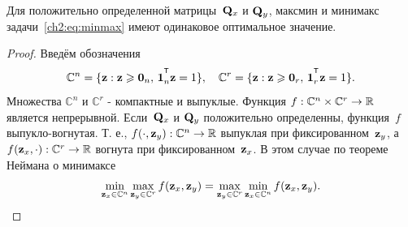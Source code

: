 \begin{theorem}
	Для положительно определенной матрицы~$\mathbf{Q}_x$ и $\mathbf{Q}_y$, максмин и минимакс задачи~\eqref{ch2:eq:minmax} имеют одинаковое оптимальное значение.
\end{theorem}
\begin{proof}
	Введём обозначения
	\begin{equation*}
	\mathbb{C}^n = \{\bz : \bz \geq \bZero_n, \, \bOne_n^{\T}\bz=1\}, \quad \mathbb{C}^r = \{\bz : \bz \geq \bZero_r, \, \bOne_r^{\T}\bz=1\}.
	\end{equation*}
	Множества $\mathbb{C}^n$ и $\mathbb{C}^r$ - компактные и выпуклые. Функция $f: \mathbb{C}^n \times \mathbb{C}^r \rightarrow \mathbb{R}$ является непрерывной. Если~$\mathbf{Q}_x$ и $\mathbf{Q}_y$ положительно определенны, функция~$f$ выпукло-вогнутая. Т. е.,
	$f(\cdot, \mathbf{z}_y): \mathbb{C}^n \rightarrow \mathbb{R}$ выпуклая при фиксированном~$\mathbf{z}_y$, а $f(\mathbf{z}_x, \cdot): \mathbb{C}^r \rightarrow \mathbb{R}$ вогнута при фиксированном~$\mathbf{z}_x$.
	В этом случае по теореме Неймана о минимаксе
	\begin{equation*}
	\min_{\mathbf{z}_x \in \mathbb{C}^n} \max_{\mathbf{z}_y \in \mathbb{C}^r} f(\mathbf{z}_x, \mathbf{z}_y) = \max_{\mathbf{z}_y \in \mathbb{C}^r} \min_{\mathbf{z}_x\in \mathbb{C}^n} f(\mathbf{z}_x, \mathbf{z}_y).
	\end{equation*}
\end{proof}

